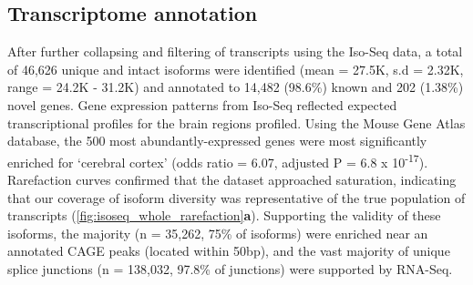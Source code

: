 \subsection{Transcriptome annotation}
After further collapsing and filtering of transcripts using the Iso-Seq data, a total of 46,626 unique and intact isoforms were identified (mean = 27.5K, s.d = 2.32K, range = 24.2K - 31.2K) and annotated to 14,482 (98.6\%) known and 202 (1.38\%) novel genes. Gene expression patterns from Iso-Seq reflected expected transcriptional profiles for the brain regions profiled. Using the Mouse Gene Atlas database, the 500 most abundantly-expressed genes were most significantly enriched for ‘cerebral cortex’ (odds ratio = 6.07, adjusted P = 6.8 x 10\textsuperscript{-17}). Rarefaction curves confirmed that the dataset approached saturation, indicating that our coverage of isoform diversity was representative of the true population of transcripts (\cref{fig:isoseq_whole_rarefaction}\textbf{a}). Supporting the validity of these isoforms, the majority (n = 35,262, 75\% of isoforms) were enriched near an annotated CAGE peaks (located within 50bp), and the vast majority of unique splice junctions (n = 138,032, 97.8\% of junctions) were supported by RNA-Seq.

